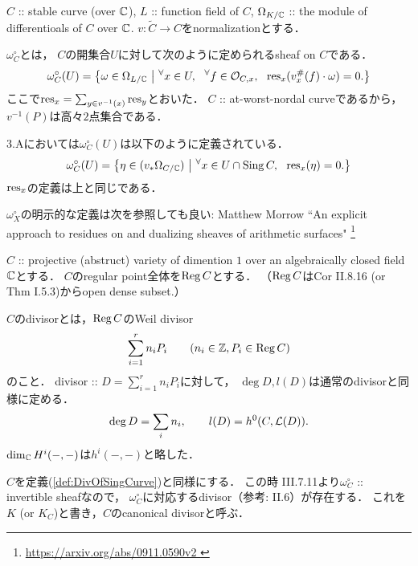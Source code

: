 \documentclass[a4paper]{jsarticle}
\newcommand{\dualsh}{\omega^{\circ}}
\newcommand{\dersh}{\Omega}
\newcommand{\dermod}{\Omega}
\begin{document}
    \begin{Def}
        $C$ :: stable curve (over $\mathbb{C}$),
        $L$ :: function field of $C$,
        $\dermod_{K/\C}$ :: the module of differentioals of $C$ over $\mathbb{C}$.
        $v: \tilde{C} \to C$をnormalizationとする．
        
        $\dualsh_C$とは，
        $C$の開集合$U$に対して次のように定められるsheaf on $C$である．
        \[
            \dualsh_C(U)=
            \left\{
                \omega \in \dermod_{L/\C}
                \ \middle|\ 
                \Forall{x \in U} \Forall{f \in \shO_{C, x}} \res_x(v^{\#}_x(f) \cdot \omega)=0.
            \right\}
        \]
        ここで$\operatorname{res}_x=\sum_{y \in v^{-1}(x)} \operatorname{res}_y$とおいた．
        $C$ :: at-worst-nordal curveであるから，
        $v^{-1}(P)$は高々$2$点集合である．
    \end{Def}
    \begin{Remark}
        \cite{HaMo} 3.Aにおいては$\dualsh_C(U)$は以下のように定義されている．
        \[
            \dualsh_C(U)=
            \left\{
                \eta \in (v_*\dersh_{C/\C})
                \ \middle|\ 
                \Forall{x \in U \cap \Sing C} \res_x(\eta)=0.
            \right\}
        \]
        $\operatorname{res}_x$の定義は上と同じである．

        $\dualsh_X$の明示的な定義は次を参照しても良い:
        Matthew Morrow
        ``An explicit approach to residues on and dualizing sheaves of arithmetic surfaces"
        \footnote{\url{ https://arxiv.org/abs/0911.0590v2 }}
    \end{Remark}

    \begin{Def} \label{def:DivOfSingCurve}
        $C$ :: projective (abstruct) variety of dimention $1$
        over an algebraically closed field $\mathbb{C}$とする．
        $C$のregular point全体を$\operatorname{Reg} C$とする．
        （$\operatorname{Reg} C$はCor II.8.16 (or Thm I.5.3)からopen dense subset.）

        $C$のdivisorとは，$\operatorname{Reg} C$のWeil divisor
        \[ \sum_{i=1}^{r} n_i P_i \qquad (n_i \in \mathbb{Z}, P_i \in \operatorname{Reg} C) \]
        のこと．
        divisor :: $D=\sum_{i=1}^{r} n_i P_i$に対して，
        $\deg D, l(D)$は通常のdivisorと同様に定める．
        \[ \deg D=\sum_i n_i, \qquad l(D)=h^0(C, \mathcal{L}(D)). \]
        $\dim_{\mathbb{C}} H^i(-,-)$は$h^i(-,-)$と略した．
    \end{Def}

    \begin{Def}
        $C$を定義(\ref{def:DivOfSingCurve})と同様にする．
        この時\cite{HarAG} III.7.11より$\dualsh_C$ :: invertible sheafなので，
        $\dualsh_C$に対応するdivisor（参考: \cite{HarAG} II.6）が存在する．
        これを$K$ (or $K_C$)と書き，$C$のcanonical divisorと呼ぶ．
    \end{Def}
\end{document}
